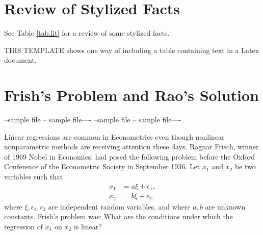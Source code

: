 \documentclass[12pt]{article}\usepackage[]{graphicx}\usepackage[]{color}
\begin{document}
\section{Review of Stylized Facts}
See Table \ref{tab.lit} for a review of some stylized facts.

THIS TEMPLATE shows one way of including a table containing text
in a Latex document.


\begin{table}[ht]
\caption{Stylized facts of major interest rates in India} 
\centering
{}
 \label{tab.lit}
\end{table}

\section{Frish's Problem and Rao's Solution}
--sample file -- sample file----
--sample file -- sample file----

Linear regressions are common in Econometrics even though
nonlinear nonparametric methods are receiving attention these days.
Ragnar Frisch, winner of 1969 Nobel in Economics,
had posed the following problem before the
Oxford Conference of the Econometric Society in September 1936. Let
$x_1$ and $x_2$ be two variables such that
\begin{eqnarray}
\label{eq.frisch}
x_1 &= a \xi + \epsilon_1, \nonumber \\
x_2 &= b \xi + \epsilon_2,
\end{eqnarray}
where $\xi, \epsilon_1, \epsilon_2$ are independent random variables,
and where $a, b$ are unknown constants.  Frish's problem
was: What are the conditions under which the regression of $x_1$ on
$x_2$ is linear?
\end{document}
